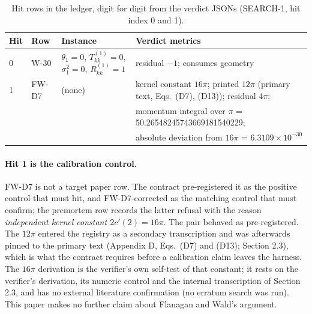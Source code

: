 \documentclass[11pt]{article}
\begin{document}
\begin{table}[t]
\centering
\caption{Hit rows in the ledger, digit for digit from the verdict JSONs (SEARCH-1, hit index 0 and 1).}
\label{tab:hits}
\small
\begin{tabular}{llll}
\toprule
Hit & Row & Instance & Verdict metrics \\
\midrule
0 & W-30 & $\theta_1 = 0$, $T^{(1)}_{kk} = 0$, $\sigma^2_1 = 0$, $R^{(1)}_{kk} = 1$ & residual $-1$; consumes geometry \\
1 & FW-D7 & (none) & kernel constant $16\pi$; printed $12\pi$ (primary text, Eqs.\ (D7), (D13)); residual $4\pi$; \\
 & & & momentum integral over $\pi$ = 50.26548245743669181540229; \\
 & & & absolute deviation from $16\pi$ = $6.3109\times 10^{-30}$ \\
\bottomrule
\end{tabular}
\end{table}

\paragraph{Hit 1 is the calibration control.} FW-D7 is not a target paper row. The contract pre-registered it as the positive control that must hit, and FW-D7-corrected as the matching control that must confirm; the premortem row records the latter refusal with the reason \emph{independent kernel constant $2c'(2) = 16\pi$}. The pair behaved as pre-registered. The $12\pi$ entered the registry as a secondary transcription and was afterwards pinned to the primary text (Appendix D, Eqs.\ (D7) and (D13); Section 2.3), which is what the contract requires before a calibration claim leaves the harness. The $16\pi$ derivation is the verifier's own self-test of that constant; it rests on the verifier's derivation, its numeric control and the internal transcription of Section 2.3, and has no external literature confirmation (no erratum search was run). This paper makes no further claim about Flanagan and Wald's argument.
\end{document}
